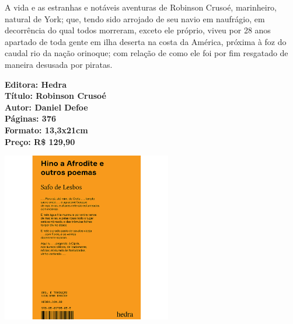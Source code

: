 \hspace*{-7cm}\hrulefill\hspace*{-7cm}

\medskip

\noindent{}A vida e as estranhas e notáveis aventuras de Robinson Crusoé, marinheiro, natural de York; que, tendo sido arrojado de seu navio em naufrágio, em decorrência do qual todos morreram, exceto ele próprio, viveu por 28 anos apartado de toda gente em ilha deserta na costa da América, próxima à foz do caudal rio da nação orinoque; com relação de como ele foi por fim resgatado de maneira desusada por piratas.

\vfill

\noindent\begin{minipage}[c]{1\linewidth}
{\small\textbf{
\hspace*{-.1cm}Editora: Hedra\\
Título: Robinson Crusoé\\
Autor: Daniel Defoe\\ 
Páginas: 376\\
Formato: 13,3x21cm\\
Preço: R\$ 129,90\\
}}
\end{minipage}

\pagebreak


\begin{center}
\hspace*{-3.6cm}
\hspace*{3.1cm}\includegraphics[width=74mm]{./grid/safo.jpg}
\end{center}

\hspace*{-7cm}\hrulefill\hspace*{-7cm}

